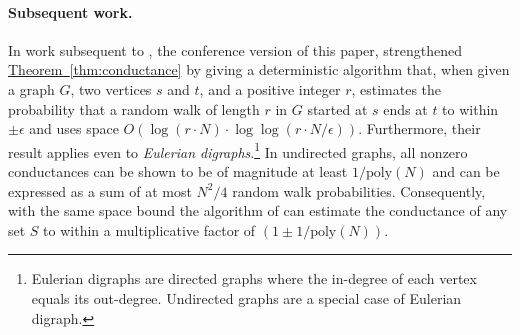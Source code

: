 \documentclass[11pt]{article}
\numberwithin{equation}{section}
\theoremstyle{definition}
\theoremstyle{plain}
\newcommand{\expref}[2]{\hyperref[#2]{#1~\ref{#2}}}
\newcommand{\poly}{\mathrm{poly}}
\numberwithin{myalgctr}{section}
\theoremstyle{named}
\begin{document}
\paragraph{Subsequent work.}
%
In work subsequent to \cite{conf-version}, the conference version of this
paper,  %
\cite{akmpsv19} strengthened \expref{Theorem}{thm:conductance} by giving a deterministic algorithm that, when given a graph $G$, two vertices $s$ and $t$, and a positive integer $r$, estimates the probability that a random walk of length $r$ in $G$ started at $s$ ends at $t$ to within $\pm\epsilon$ and uses space $O(\log (r\cdot N)\cdot\log\log(r\cdot N/\epsilon))$. Furthermore, their result applies even to \emph{Eulerian digraphs}.\footnote{Eulerian digraphs are directed graphs where the in-degree of each vertex 
equals its out-degree. Undirected graphs are a special case of Eulerian
%
digraph.}   %
In undirected graphs, all nonzero conductances can be shown to be of magnitude at least $1/\poly(N)$ and can be expressed as a sum of at most $N^2/4$ random walk probabilities.  Consequently, with the same space bound the algorithm of \cite{akmpsv19} can estimate the conductance of any set $S$ to within a multiplicative factor of $(1\pm 1/\poly(N))$.
\fi 
\end{document}
